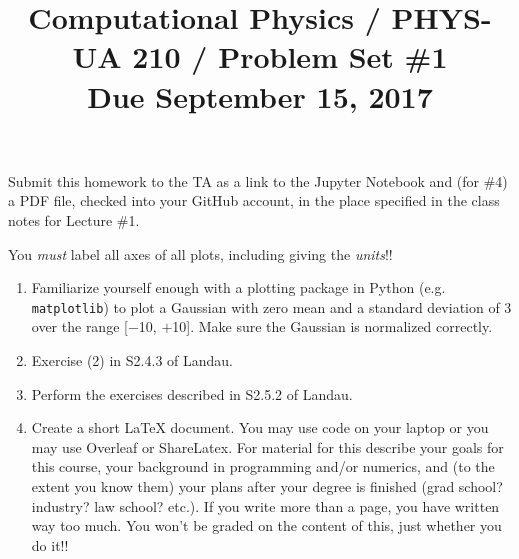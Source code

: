 \documentclass[11pt, preprint]{aastex}
\begin{document}
\title{\bf Computational Physics / PHYS-UA 210 / Problem Set \#1
\\ Due September 15, 2017 }

Submit this homework to the TA as a link to the Jupyter Notebook and
(for \#4) a PDF file, checked into your GitHub account, in the place
specified in the class notes for Lecture \#1.

You {\it must} label all axes of all plots, including giving the {\it
  units}!!

\begin{enumerate}

  \item Familiarize yourself enough with a plotting package in Python
    (e.g. {\tt matplotlib}) to plot a Gaussian with zero mean and a
    standard deviation of 3 over the range [$-$10, $+$10]. Make sure
    the Gaussian is normalized correctly.

  \item Exercise (2) in S2.4.3 of Landau.

  \item Perform the exercises described in S2.5.2 of Landau.

  \item Create a short LaTeX document. You may use code on your laptop
    or you may use Overleaf or ShareLatex. For material for this
    describe your goals for this course, your background in
    programming and/or numerics, and (to the extent you know them)
    your plans after your degree is finished (grad school? industry?
    law school? etc.). If you write more than a page, you have written
    way too much. You won't be graded on the content of this, just
    whether you do it!!

\end{enumerate}
\end{document}
